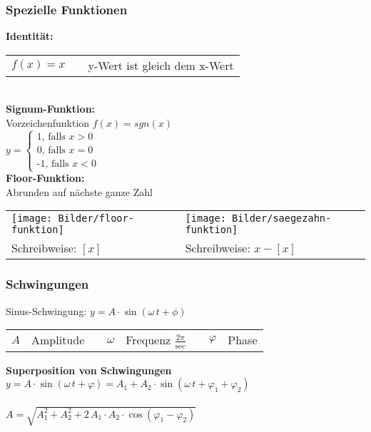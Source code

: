 \subsubsection{Spezielle Funktionen}
    \textbf{Identität:} \\
        \begin{tabular}{lll}
            $f(x) = x$ & &  y-Wert ist gleich dem x-Wert 
        \end{tabular}
    \\
    \textbf{Signum-Funktion:} \\
        Vorzeichenfunktion $f(x)=sgn(x)$\\
        $y= \left\{\begin{array}{l}\text{1, falls $x>0$} \\
                                   \text{0, falls $x=0$} \\
                                   \text{-1, falls $x<0$}\end{array}\right.$
    \\	
    \textbf{Floor-Funktion:} \\
         Abrunden auf nächste ganze Zahl \\
    
        \begin{tabular}{lll}
            \texttt{[image: Bilder/floor-funktion]} & &  \texttt{[image: Bilder/saegezahn-funktion]} \\
            Schreibweise: \textbf{$[x]$}                        & &  Schreibweise: \textbf{$x - [x]$} \\
        \end{tabular}
    
\subsubsection{Schwingungen}
    Sinus-Schwingung:  $y = A \cdot \sin(\omega \, t + \phi)$ \\
    
    \begin{tabular}{llllllll}
        $A$ & Amplitude & & $\omega$ & Frequenz $\frac{2 \pi}{\mathrm{sec}}$ & & $\varphi$ & Phase \\
    \end{tabular}			
    
    \textbf{Superposition von Schwingungen} \\
    $y = A \cdot \sin(\omega \, t + \varphi)  =  A_1 + A_2 \cdot \sin(\omega \, t + \varphi_1 + \varphi_2)$\\ 
    \\
    $A = \sqrt{A_1^2 + A_2^2 + 2 \,A_1 \cdot A_2 \cdot \cos(\varphi_1 - \varphi_2)}$
    
